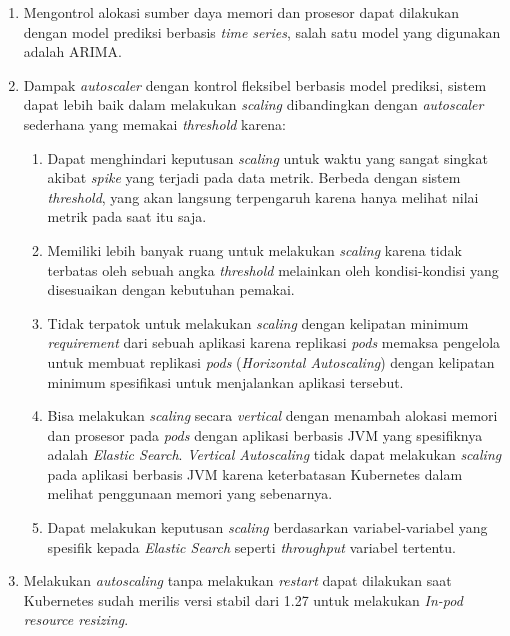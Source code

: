 \begin{enumerate}
    \item Mengontrol alokasi sumber daya memori dan prosesor dapat dilakukan dengan model prediksi berbasis \textit{time series}, salah satu model yang digunakan adalah ARIMA.
    \item Dampak \textit{autoscaler} dengan kontrol fleksibel berbasis model prediksi, sistem dapat lebih baik dalam melakukan \textit{scaling} dibandingkan dengan \textit{autoscaler} sederhana yang memakai \textit{threshold} karena:

        \begin{enumerate}
            \item Dapat menghindari keputusan \textit{scaling} untuk waktu yang sangat singkat akibat \textit{spike} yang terjadi pada data metrik. Berbeda dengan sistem \textit{threshold}, yang akan langsung terpengaruh karena hanya melihat nilai metrik pada saat itu saja.
            \item Memiliki lebih banyak ruang untuk melakukan \textit{scaling} karena tidak terbatas oleh sebuah angka \textit{threshold} melainkan oleh kondisi-kondisi yang disesuaikan dengan kebutuhan pemakai.
            \item Tidak terpatok untuk melakukan \textit{scaling} dengan kelipatan minimum \textit{requirement} dari sebuah aplikasi karena replikasi \textit{pods} memaksa pengelola untuk membuat replikasi \textit{pods} (\textit{Horizontal Autoscaling}) dengan kelipatan minimum spesifikasi untuk menjalankan aplikasi tersebut.
            \item Bisa melakukan \textit{scaling} secara \textit{vertical} dengan menambah alokasi memori dan prosesor pada \textit{pods} dengan aplikasi berbasis JVM yang spesifiknya adalah \textit{Elastic Search}. \textit{Vertical Autoscaling} tidak dapat melakukan \textit{scaling} pada aplikasi berbasis JVM karena keterbatasan Kubernetes dalam melihat penggunaan memori yang sebenarnya.
            \item Dapat melakukan keputusan \textit{scaling} berdasarkan variabel-variabel yang spesifik kepada \textit{Elastic Search} seperti \textit{throughput} variabel tertentu.
        \end{enumerate}

    \item Melakukan \textit{autoscaling} tanpa melakukan \textit{restart} dapat dilakukan saat Kubernetes sudah merilis versi stabil dari 1.27 untuk melakukan \textit{In-pod resource resizing}.
\end{enumerate}

